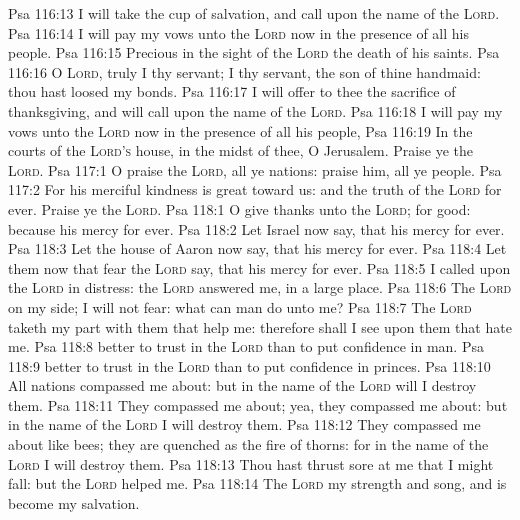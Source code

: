 \vs Psa 116:13 I will take the cup of salvation, and call upon the name of the \textsc{Lord}.
\vs Psa 116:14 I will pay my vows unto the \textsc{Lord} now in the presence of all his people.
\vs Psa 116:15 Precious in the sight of the \textsc{Lord}  the death of his saints.
\vs Psa 116:16 O \textsc{Lord}, truly I  thy servant; I  thy servant,  the son of thine handmaid: thou hast loosed my bonds.
\vs Psa 116:17 I will offer to thee the sacrifice of thanksgiving, and will call upon the name of the \textsc{Lord}.
\vs Psa 116:18 I will pay my vows unto the \textsc{Lord} now in the presence of all his people,
\vs Psa 116:19 In the courts of the \textsc{Lord's} house, in the midst of thee, O Jerusalem. Praise ye the \textsc{Lord}.
\vs Psa 117:1 O praise the \textsc{Lord}, all ye nations: praise him, all ye people.
\vs Psa 117:2 For his merciful kindness is great toward us: and the truth of the \textsc{Lord}  for ever. Praise ye the \textsc{Lord}.
\vs Psa 118:1 O give thanks unto the \textsc{Lord}; for  good: because his mercy  for ever.
\vs Psa 118:2 Let Israel now say, that his mercy  for ever.
\vs Psa 118:3 Let the house of Aaron now say, that his mercy  for ever.
\vs Psa 118:4 Let them now that fear the \textsc{Lord} say, that his mercy  for ever.
\vs Psa 118:5 I called upon the \textsc{Lord} in distress: the \textsc{Lord} answered me,  in a large place.
\vs Psa 118:6 The \textsc{Lord}  on my side; I will not fear: what can man do unto me?
\vs Psa 118:7 The \textsc{Lord} taketh my part with them that help me: therefore shall I see  upon them that hate me.
\vs Psa 118:8  better to trust in the \textsc{Lord} than to put confidence in man.
\vs Psa 118:9  better to trust in the \textsc{Lord} than to put confidence in princes.
\vs Psa 118:10 All nations compassed me about: but in the name of the \textsc{Lord} will I destroy them.
\vs Psa 118:11 They compassed me about; yea, they compassed me about: but in the name of the \textsc{Lord} I will destroy them.
\vs Psa 118:12 They compassed me about like bees; they are quenched as the fire of thorns: for in the name of the \textsc{Lord} I will destroy them.
\vs Psa 118:13 Thou hast thrust sore at me that I might fall: but the \textsc{Lord} helped me.
\vs Psa 118:14 The \textsc{Lord}  my strength and song, and is become my salvation.
